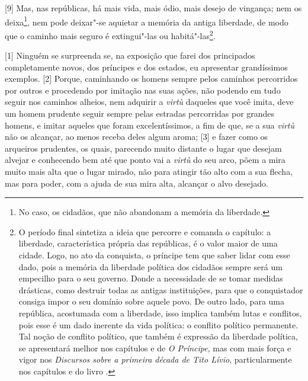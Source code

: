 {[}9{]} Mas, nas repúblicas, há mais vida, mais ódio, mais desejo de
vingança; nem os deixa\footnote{No caso, os cidadãos, que não abandonam
  a memória da liberdade.}, nem pode deixar"-se aquietar a memória da
antiga liberdade, de modo que o caminho mais seguro é extingui"-las ou
habitá"-las\footnote{O período final sintetiza a ideia que percorre e
  comanda o capítulo: a liberdade, característica própria das
  repúblicas, é o valor maior de uma cidade. Logo, no ato da conquista,
  o príncipe tem que saber lidar com esse dado, pois a memória da
  liberdade política dos cidadãos sempre será um empecilho para o seu
  governo. Donde a necessidade de se tomar medidas drásticas, como
  destruir todas as antigas instituições, para que o conquistador
  consiga impor o seu domínio sobre aquele povo. De outro lado, para uma
  república, acostumada com a liberdade, isso implica também lutas e
  conflitos, pois esse é um dado inerente da vida política: o conflito
  político permanente. Tal noção de conflito político, que também é
  expressão da liberdade política, se apresentará melhor nos capítulos
   e  de \emph{O Príncipe}, mas com mais força e vigor nos
  \emph{Discursos sobre a primeira década de Tito Lívio},
  particularmente nos capítulos  e  do livro .}.


{[}1{]} Ninguém se surpreenda se, na exposição que farei dos principados
completamente novos, dos príncipes e dos estados, eu apresentar
grandíssimos exemplos. {[}2{]} Porque, caminhando os homens sempre pelos
caminhos percorridos por outros e procedendo por imitação nas suas
ações, não podendo em tudo seguir nos caminhos alheios, nem adquirir a
\emph{virtù} daqueles que você imita, deve um homem prudente seguir
sempre pelas estradas percorridas por grandes homens, e imitar aqueles
que foram excelentíssimos, a fim de que, se a sua \emph{virtù} não os
alcançar, ao menos receba deles algum aroma; {[}3{]} e fazer como os
arqueiros prudentes, os quais, parecendo muito distante o lugar que
desejam alvejar e conhecendo bem até que ponto vai a \emph{virtù} do seu
arco, põem a mira muito mais alta que o lugar mirado, não para atingir
tão alto com a sua flecha, mas para poder, com a ajuda de sua mira alta,
alcançar o alvo desejado.

